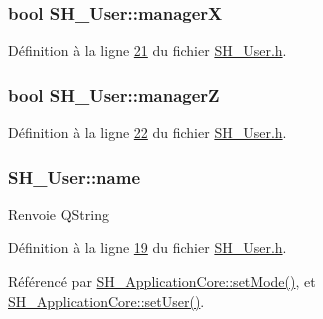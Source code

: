 \hypertarget{classSH__User_a1794a1229076bcaf2de708146db574b3}{
\subsubsection[{manager\-X}]{\setlength{\rightskip}{0pt plus 5cm}bool S\-H\-\_\-\-User\-::manager\-X\hspace{0.3cm}{\ttfamily [read]}}}\label{classSH__User_a1794a1229076bcaf2de708146db574b3}


Définition à la ligne \hyperlink{SH__User_8h_source_l00021}{21} du fichier \hyperlink{SH__User_8h_source}{S\-H\-\_\-\-User.\-h}.

\hypertarget{classSH__User_ad5e987610bea0bd50bbc0a1d1ac0aed5}{
\subsubsection[{manager\-Z}]{\setlength{\rightskip}{0pt plus 5cm}bool S\-H\-\_\-\-User\-::manager\-Z\hspace{0.3cm}{\ttfamily [read]}}}\label{classSH__User_ad5e987610bea0bd50bbc0a1d1ac0aed5}


Définition à la ligne \hyperlink{SH__User_8h_source_l00022}{22} du fichier \hyperlink{SH__User_8h_source}{S\-H\-\_\-\-User.\-h}.

\hypertarget{classSH__User_ae32b20d52e62ec32c1f335006f52214e}{
\subsubsection[{name}]{\setlength{\rightskip}{0pt plus 5cm}S\-H\-\_\-\-User\-::name\hspace{0.3cm}{\ttfamily [read]}}}\label{classSH__User_ae32b20d52e62ec32c1f335006f52214e}
\begin{DoxyReturn}{Renvoie}
Q\-String 
\end{DoxyReturn}


Définition à la ligne \hyperlink{SH__User_8h_source_l00019}{19} du fichier \hyperlink{SH__User_8h_source}{S\-H\-\_\-\-User.\-h}.



Référencé par \hyperlink{classSH__ApplicationCore_a2bfe19528b27831332559d5d2cd24d25}{S\-H\-\_\-\-Application\-Core\-::set\-Mode()}, et \hyperlink{classSH__ApplicationCore_a2dd5c029a2ea348f1dfd0a60dea476e4}{S\-H\-\_\-\-Application\-Core\-::set\-User()}.

